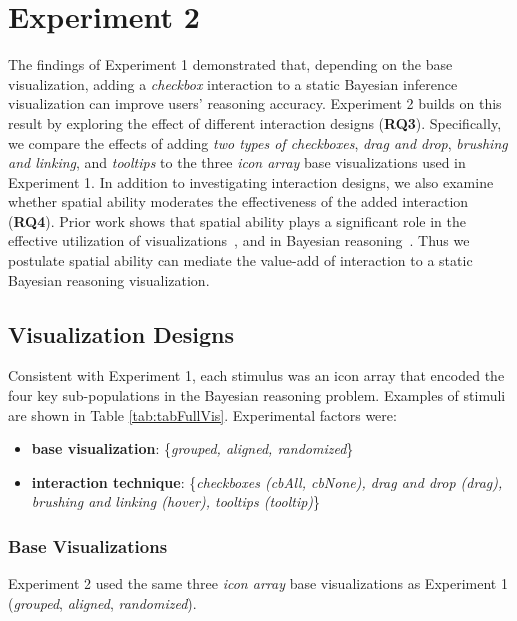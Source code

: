 \section{Experiment 2}
The findings of Experiment 1 demonstrated that, depending on the base visualization, adding a \textit{checkbox} interaction to a static Bayesian inference visualization can improve users' reasoning accuracy. Experiment 2 builds on this result by exploring the effect of different interaction designs (\textbf{RQ3}). Specifically, we compare the effects of adding \textit{two types of checkboxes}, \textit{drag and drop}, \textit{brushing and linking}, and \textit{tooltips} to the three \textit{icon array} base visualizations used in Experiment 1. 
In addition to investigating interaction designs, we also examine whether spatial ability moderates the effectiveness of the added interaction (\textbf{RQ4}). Prior work shows that spatial ability plays a significant role in the effective utilization of visualizations~\cite{liu2020Survey}, and in Bayesian reasoning~\cite{ottley2016Bayesian}. Thus we postulate spatial ability can mediate the value-add of interaction to a static Bayesian reasoning visualization. 

\subsection{Visualization Designs}
Consistent with Experiment 1, each stimulus was an icon array that encoded the four key sub-populations in the Bayesian reasoning problem. %
Examples of stimuli are shown in Table \ref{tab:tabFullVis}. Experimental factors were:
\begin{itemize}
    \item \textbf{base visualization}: \{\textit{grouped, aligned, randomized}\}
    \item \textbf{interaction technique}: \{\textit{checkboxes (cbAll, cbNone), drag and drop (drag), brushing and linking (hover), tooltips (tooltip)}\}
\end{itemize}

\subsubsection{Base Visualizations}
Experiment 2 used the same three \textit{icon array} base visualizations as Experiment 1 (\textit{grouped}, \textit{aligned}, \textit{randomized}). 

